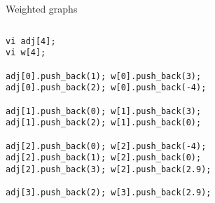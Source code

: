 \documentclass[12pt,t]{beamer}
\begin{document}
\begin{frame}[fragile]{Weighted graphs}
    \begin{columns}[T]
        \begin{column}{.4\textwidth}
            \begin{verbatim}
vi adj[4];
vi w[4];

adj[0].push_back(1); w[0].push_back(3);
adj[0].push_back(2); w[0].push_back(-4);

adj[1].push_back(0); w[1].push_back(3);
adj[1].push_back(2); w[1].push_back(0);

adj[2].push_back(0); w[2].push_back(-4);
adj[2].push_back(1); w[2].push_back(0);
adj[2].push_back(3); w[2].push_back(2.9);

adj[3].push_back(2); w[3].push_back(2.9);

            \end{verbatim}
        \end{column}%
        \hfill%
        \begin{column}{.6\textwidth}
            \begin{figure}
            \end{figure}
        \end{column}%
    \end{columns}
\end{frame}
\end{document}
